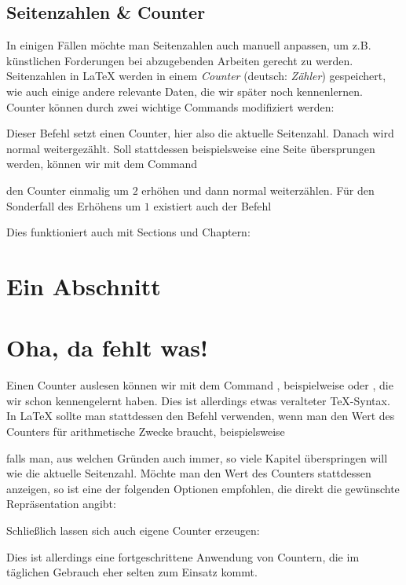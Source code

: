 \subsection{Seitenzahlen \& Counter}
In einigen Fällen möchte man Seitenzahlen auch manuell anpassen, um z.B. künstlichen Forderungen bei abzugebenden Arbeiten gerecht zu werden.
Seitenzahlen in \LaTeX{} werden in einem \emph{Counter} (deutsch: \emph{Zähler}) gespeichert, wie auch einige andere relevante Daten, die wir später noch kennenlernen.
Counter können durch zwei wichtige Commands modifiziert werden:
\begin{latexlisting}
	\setcounter{page}{3}
\end{latexlisting}
Dieser Befehl setzt einen Counter, hier also die aktuelle Seitenzahl.
Danach wird normal weitergezählt.
Soll stattdessen beispielsweise eine Seite übersprungen werden, können wir mit dem Command
\begin{latexlisting}
	\addtocounter{page}{2}
\end{latexlisting}
den Counter einmalig um $2$ erhöhen und dann normal weiterzählen.
Für den Sonderfall des Erhöhens um $1$ existiert auch der Befehl
\begin{latexlisting}
\end{latexlisting}
Dies funktioniert auch mit Sections und Chaptern:
\begin{latexlisting}
	\section{Ein Abschnitt}
	\addtocounter{section}{1}
	\section{Oha, da fehlt was!}
\end{latexlisting}
Einen Counter auslesen können wir mit dem Command , beispielweise  oder , die wir schon kennengelernt haben.
Dies ist allerdings etwas veralteter \TeX -Syntax.
In \LaTeX{} sollte man stattdessen den Befehl  verwenden, wenn man den Wert des Counters für arithmetische Zwecke braucht, beispielsweise
\begin{latexlisting}
	\addtocounter{section}{\value{page}}
\end{latexlisting}
falls man, aus welchen Gründen auch immer, so viele Kapitel überspringen will wie die aktuelle Seitenzahl.
Möchte man den Wert des Counters stattdessen anzeigen, so ist eine der folgenden Optionen empfohlen, die direkt die gewünschte Repräsentation angibt:
\begin{latexlisting}
\end{latexlisting}
Schließlich lassen sich auch eigene Counter erzeugen:
\begin{latexlisting}
\end{latexlisting}
Dies ist allerdings eine fortgeschrittene Anwendung von Countern, die im täglichen Gebrauch eher selten zum Einsatz kommt.


